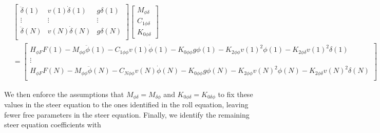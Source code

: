 \documentclass[a4paper]{article}
\begin{document}
\small{
\begin{align}
  &\begin{bmatrix}
     \ddot{\delta}(1) &
     v(1) \dot{\delta}(1) &
     g \delta(1) \\
     \vdots & \vdots & \vdots\\
     \ddot{\delta}(N) &
     v(N) \dot{\delta}(N) &
     g \delta(N) \\
  \end{bmatrix}
  \begin{bmatrix}
    M_{\phi\delta} \\
    C_{1\phi\delta} \\
    K_{0\phi\delta}
  \end{bmatrix}\\
  &=
  \begin{bmatrix}
    H_{\phi F} F(1)
    - M_{\phi\phi} \ddot{\phi}(1)
    - C_{1\phi\phi} v(1) \dot{\phi}(1)
    - K_{0\phi\phi} g \phi(1)
    - K_{2\phi\phi} v(1)^2 \phi(1)
    - K_{2\phi\delta} v(1)^2 \delta(1) \\
  \vdots\\
    H_{\phi F} F(N)
    - M_{\phi\phi} \ddot{\phi}(N)
    - C_{N\phi\phi} v(N) \dot{\phi}(N)
    - K_{0\phi\phi} g \phi(N)
    - K_{2\phi\phi} v(N)^2 \phi(N)
    - K_{2\phi\delta} v(N)^2 \delta(N) \\
  \end{bmatrix} \nonumber
\end{align}
}

We then enforce the assumptions that $M_{\phi\delta} = M_{\delta\phi}$ and
$K_{0\phi\delta} = K_{0\delta\phi}$ to fix these values in the steer equation
to the ones identified in the roll equation, leaving fewer free parameters in
the steer equation. Finally, we identify the remaining steer equation
coefficients with
\end{document}
